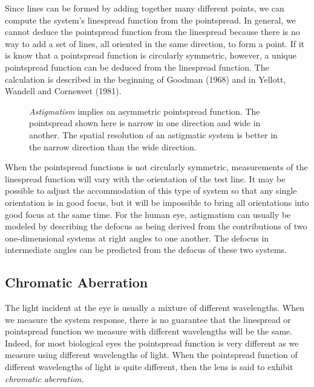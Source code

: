 Since lines can be formed by adding together many different points,
we can compute the system's linespread function from the pointspread.
In general,
we cannot deduce the pointspread function from the linespread
because there is no way to add a set of lines,
all oriented in the same direction, to form a point.
If it is know that a pointspread function is circularly symmetric,
however, a unique pointspread function
can be deduced from the linespread function.
The calculation is described in the beginning of
Goodman (1968) and in Yellott, Wandell and Cornsweet (1981).
\nocite{Goodman'sBook,YellottWandellCornsweet}

\begin{figure}
\centerline{
}
\caption[Astigmatism]{
{\em Astigmatism} implies an asymmetric pointspread function.
The pointspread shown here is narrow in one direction
and wide in another.
The spatial resolution of an astigmatic
system is better in the narrow direction 
than the wide direction.
}
\label{f1:astigmatism}
\end{figure}
When the pointspread functions is not circularly symmetric,
measurements of the linespread function
will vary with the orientation of the test line.
It may be possible to adjust the accommodation of this
type of system so that any single orientation is in good focus,
but it will be impossible to bring all orientations into
good focus at the same time.
For the human eye, astigmatism can usually be modeled
by describing the defocus as being derived from
the contributions of two one-dimensional systems at
right angles to one another.
The defocus in intermediate angles can be
predicted from the defocus of these two systems.

\subsection*{Chromatic Aberration}
The light incident at the eye is usually a mixture
of different wavelengths.
When we measure the system response, there is no guarantee
that the linespread or pointspread function we measure with
different wavelengths will be the same.
Indeed, for most biological eyes the
pointspread function is very different as we measure
using different wavelengths of light.
When the pointspread function of different wavelengths
of light is quite different, then the lens is said to
exhibit {\em chromatic aberration}.

